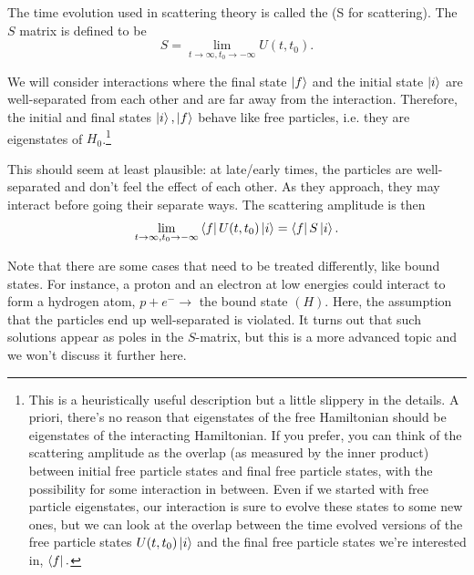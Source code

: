 \begin{defn}
The time evolution used in scattering theory is called the  (S for scattering). The $S$ matrix is defined to be
$$S=\lim_{t\to \infty,t_0\to -\infty}U(t,t_0).$$
\end{defn}
We will consider interactions where the final state $\left| f \right>$ and the initial state $\left| i \right>$ are well-separated from each other and are far away from the interaction. Therefore, the initial and final states $\left| i \right>,\left| f \right>$ behave like free particles, i.e. they are eigenstates of $H_0$.\footnote{This is a heuristically useful description but a little slippery in the details. A  priori, there's no reason that eigenstates of the free Hamiltonian should be eigenstates of the interacting Hamiltonian. If you prefer, you can think of the scattering amplitude as the overlap (as measured by the inner product) between initial free particle states and final free particle states, with the possibility for some interaction in between. Even if we started with free particle eigenstates, our interaction is sure to evolve these states to some new ones, but we can look at the overlap between the time evolved versions of the free particle states $U(t,t_0)\left| i \right>$ and the final free particle states we're interested in, $\left< f \right|.$}

This should seem at least plausible: at late/early times, the particles are well-separated and don't feel the effect of each other. As they approach, they may interact before going their separate ways. The scattering amplitude is then
$$\lim_{t\to\infty, t_0\to -\infty}\left< f \right|U(t,t_0)\left| i \right>=\left< f \right|S \left| i \right>.$$

Note that there are some cases that need to be treated differently, like bound states. For instance, a proton and an electron at low energies could interact to form a hydrogen atom, $p+e^-\to$ the bound state $(H)$. Here, the assumption that the particles end up well-separated is violated. It turns out that such solutions appear as poles in the $S$-matrix, but this is a more advanced topic and we won't discuss it further here.

